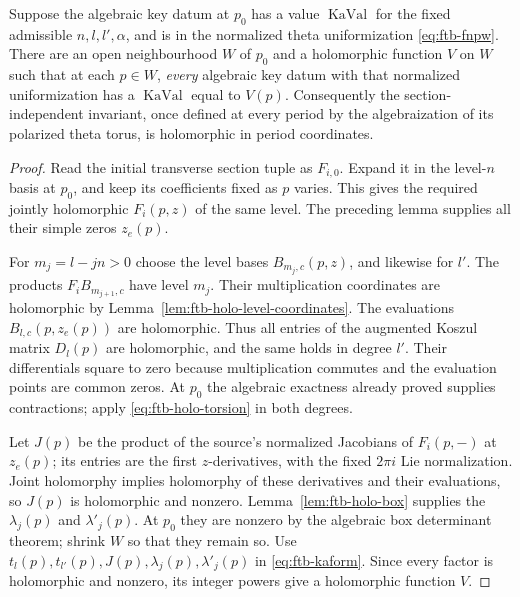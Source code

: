\begin{srproposition}
\label{prop:ftb-key-holomorphic-period}
Suppose the algebraic key datum at \(p_0\) has a value
\(\operatorname{KaVal}\) for the fixed admissible
\(n,l,l',\alpha\), and is in the normalized theta uniformization
\eqref{eq:ftb-fnpw}.
There are an open neighbourhood \(W\) of \(p_0\) and a holomorphic
function \(V\) on \(W\) such that at each \(p\in W\), \emph{every}
algebraic key datum with that normalized uniformization has
a \(\operatorname{KaVal}\) equal to \(V(p)\).
Consequently the section-independent invariant, once defined at
every period by the algebraization of its polarized theta torus,
is holomorphic in period coordinates.
\end{srproposition}
\begin{proof}
Read the initial transverse section tuple as \(F_{i,0}\).
Expand it in the level-\(n\) basis at \(p_0\), and keep its
coefficients fixed as \(p\) varies.  This gives the required
jointly holomorphic \(F_i(p,z)\) of the same level.
The preceding lemma supplies all their simple zeros \(z_e(p)\).

For \(m_j=l-jn>0\) choose the level bases
\(B_{m_j,c}(p,z)\), and likewise for \(l'\).
The products \(F_iB_{m_{j+1},c}\) have level \(m_j\).
Their multiplication coordinates are holomorphic by
Lemma~\ref{lem:ftb-holo-level-coordinates}.
The evaluations \(B_{l,c}(p,z_e(p))\) are holomorphic.
Thus all entries of the augmented Koszul matrix \(D_l(p)\)
are holomorphic, and the same holds in degree \(l'\).
Their differentials square to zero because multiplication
commutes and the evaluation points are common zeros.
At \(p_0\) the algebraic exactness already proved supplies
contractions; apply \eqref{eq:ftb-holo-torsion} in both degrees.

Let \(J(p)\) be the product of the source's normalized Jacobians
of \(F_i(p,-)\) at \(z_e(p)\); its entries are the first
\(z\)-derivatives, with the fixed \(2\pi i\) Lie normalization.
Joint holomorphy implies holomorphy of these derivatives and
their evaluations, so \(J(p)\) is holomorphic and nonzero.
Lemma~\ref{lem:ftb-holo-box} supplies the \(\lambda_j(p)\) and
\(\lambda'_j(p)\).  At \(p_0\) they are nonzero by the algebraic
box determinant theorem; shrink \(W\) so that they remain so.
Use \(t_l(p),t_{l'}(p),J(p),\lambda_j(p),\lambda'_j(p)\) in
\eqref{eq:ftb-kaform}.  Since every factor is holomorphic and
nonzero, its integer powers give a holomorphic function \(V\).


\end{proof}
